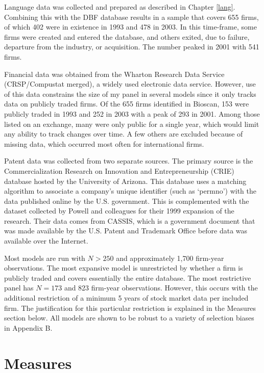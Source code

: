 Language data was collected and prepared as described in Chapter \ref{lang}. Combining this with the DBF database results in a sample that covers 655 firms, of which 402 were in existence in 1993 and 478 in 2003. In this time-frame, some firms were created and entered the database, and others exited, due to failure, departure from the industry, or acquisition. The number peaked in 2001 with 541 firms.

Financial data was obtained from the Wharton Research Data Service (CRSP/Compustat merged), a widely used electronic data service. However, use of this data constrains the size of my panel in several models since it only tracks data on publicly traded firms. Of the 655 firms identified in Bioscan, 153 were publicly traded in 1993 and 252 in 2003 with a peak of 293 in 2001. Among those listed on an exchange, many were only public for a single year, which would limit any ability to track changes over time. A few others are excluded because of missing data, which occurred most often for international firms. 

Patent data was collected from two separate sources. The primary source is the Commercialization Research on Innovation and Entrepreneurship (CRIE) database hosted by the University of Arizona. This database uses a matching algorithm to associate a company's unique identifier (such as `permno') with the data published online by the U.S. government. This is complemented with the dataset collected by Powell and colleagues for their 1999 expansion of the \citet{powell1996} research. Their data comes from CASSIS, which is a government document that was made available by the U.S. Patent and Trademark Office before data was available over the Internet.

Most models are run with $N>250$ and approximately 1,700 firm-year observations. The most expansive model is unrestricted by whether a firm is publicly traded and covers essentially the entire database. The most restrictive panel has $N=173$ and 823 firm-year observations. However, this occurs with the additional restriction of a minimum 5 years of stock market data per included firm. The justification for this particular restriction is explained in the Measures section below. All models are shown to be robust to a variety of selection biases in Appendix B.

\section{Measures}

